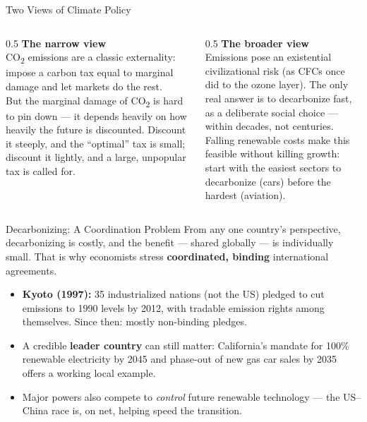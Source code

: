 \documentclass[11pt,aspectratio=169]{beamer}
\begin{document}
\begin{frame}{Two Views of Climate Policy}
  \begin{columns}[T]
    \begin{column}{0.5\textwidth}
      \textbf{The narrow view}\\
      \small CO\textsubscript{2} emissions are a classic externality: impose a carbon tax equal to marginal damage and let markets do the rest.\\[0.4em]
      But the marginal damage of CO\textsubscript{2} is hard to pin down --- it depends heavily on how heavily the future is discounted. Discount it steeply, and the ``optimal'' tax is small; discount it lightly, and a large, unpopular tax is called for.
    \end{column}
    \begin{column}{0.5\textwidth}
      \textbf{The broader view}\\
      \small Emissions pose an existential civilizational risk (as CFCs once did to the ozone layer). The only real answer is to decarbonize fast, as a deliberate social choice --- within decades, not centuries.\\[0.4em]
      Falling renewable costs make this feasible without killing growth: start with the easiest sectors to decarbonize (cars) before the hardest (aviation).
    \end{column}
  \end{columns}
\end{frame}

\begin{frame}{Decarbonizing: A Coordination Problem}
  From any one country's perspective, decarbonizing is costly, and the benefit --- shared globally --- is individually small. That is why economists stress \textbf{coordinated, binding} international agreements.
  \begin{itemize}
    \item \textbf{Kyoto (1997):} 35 industrialized nations (not the US) pledged to cut emissions to 1990 levels by 2012, with tradable emission rights among themselves. Since then: mostly non-binding pledges.
    \item A credible \textbf{leader country} can still matter: California's mandate for 100\% renewable electricity by 2045 and phase-out of new gas car sales by 2035 offers a working local example.
    \item Major powers also compete to \emph{control} future renewable technology --- the US--China race is, on net, helping speed the transition.
  \end{itemize}
\end{frame}
\end{document}

